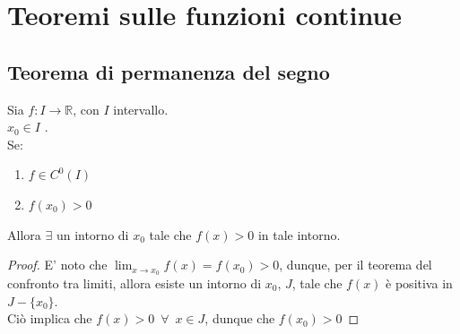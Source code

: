 \documentclass{article}
\theoremstyle{definition}
\begin{document}
\section{Teoremi sulle funzioni continue}
\subsection{Teorema di permanenza del segno}
Sia $f: I \to \mathbb{R}$, con $I$ intervallo.
\\
$x_0 \in I$ .
\\
Se:
\begin{enumerate}
    \item $f \in C^0(I)$
    \item $f(x_0)>0$
\end{enumerate}
Allora $\exists$ un intorno di $x_0$ tale che $f(x)>0$ in tale intorno.
\begin{proof}
    E' noto che $\lim_{x \to x_0}f(x)=f(x_0)>0$, dunque, per il teorema del confronto tra limiti, allora esiste un intorno di $x_0$, $J$, tale che $f(x)$ è positiva in $J - \{x_0\}$.
    \\
    Ciò implica che $f(x)>0 \,\,\,\forall \,\,\, x \in J$, dunque che $f(x_0)>0$
\end{proof}
\end{document}

